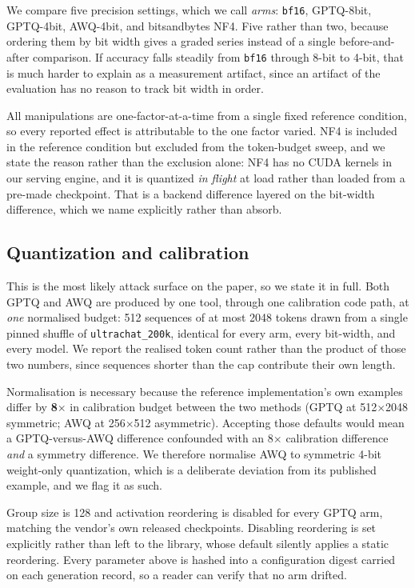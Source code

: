 \documentclass[11pt]{article}
\begin{document}
We compare five precision settings, which we call \emph{arms}: \texttt{bf16},
GPTQ-8bit, GPTQ-4bit, AWQ-4bit, and bitsandbytes NF4. Five rather than two, because
ordering them by bit width gives a graded series instead of a single before-and-after
comparison. If accuracy falls steadily from \texttt{bf16} through 8-bit to 4-bit,
that is much harder to explain as a measurement artifact, since an artifact of the
evaluation has no reason to track bit width in order.

All manipulations are one-factor-at-a-time from a single fixed reference
condition, so every reported effect is attributable to the one factor varied.
NF4 is included in the reference condition but excluded from the token-budget
sweep, and we state the reason rather than the exclusion alone: NF4 has no CUDA
kernels in our serving engine, and it is quantized \emph{in flight} at load
rather than loaded from a pre-made checkpoint. That is a backend difference
layered on the bit-width difference, which we name explicitly rather than absorb.

\subsection{Quantization and calibration}
\label{sec:quant}
This is the most likely attack surface on the paper, so we state it in full.
Both GPTQ and AWQ are produced by one tool, through one calibration code path,
at \emph{one} normalised budget: 512 sequences of at most 2048 tokens drawn from
a single pinned shuffle of \texttt{ultrachat\_200k}, identical for every arm,
every bit-width, and every model. We report the realised token count rather than
the product of those two numbers, since sequences shorter than the cap
contribute their own length.

Normalisation is necessary because the reference implementation's own examples
differ by \textbf{8$\times$} in calibration budget between the two methods
(GPTQ at 512$\times$2048 symmetric; AWQ at 256$\times$512 asymmetric). Accepting
those defaults would mean a GPTQ-versus-AWQ difference confounded with an
8$\times$ calibration difference \emph{and} a symmetry difference. We therefore
normalise AWQ to symmetric 4-bit weight-only quantization, which is a deliberate
deviation from its published example, and we flag it as such.

Group size is 128 and activation reordering is disabled for every GPTQ arm,
matching the vendor's own released checkpoints. Disabling reordering is set
explicitly rather than left to the library, whose default silently applies a
static reordering. Every parameter above is hashed into a configuration digest
carried on each generation record, so a reader can verify that no arm drifted.
\end{document}
